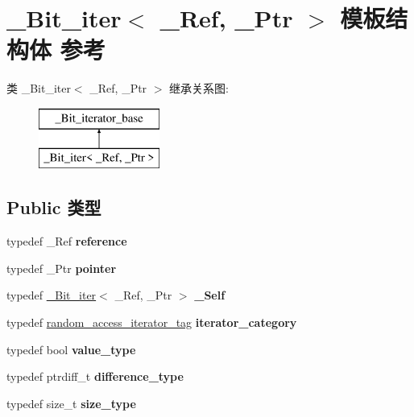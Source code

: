 \hypertarget{struct___bit__iter}{}\section{\+\_\+\+Bit\+\_\+iter$<$ \+\_\+\+Ref, \+\_\+\+Ptr $>$ 模板结构体 参考}
\label{struct___bit__iter}
类 \+\_\+\+Bit\+\_\+iter$<$ \+\_\+\+Ref, \+\_\+\+Ptr $>$ 继承关系图\+:\begin{figure}[H]
\begin{center}
\leavevmode
\includegraphics[height=2.000000cm]{struct___bit__iter}
\end{center}
\end{figure}
\subsection*{Public 类型}
\begin{DoxyCompactItemize}
\item 
\mbox{\label{struct___bit__iter_aed67c7032dc7e6f9d72cb81bc4229959}} 
typedef \+\_\+\+Ref {\bfseries reference}
\item 
\mbox{\label{struct___bit__iter_aefebc109513def679e787a0020251453}} 
typedef \+\_\+\+Ptr {\bfseries pointer}
\item 
\mbox{\label{struct___bit__iter_a9f1d4fb1f31a23badeb59ba93e2523e8}} 
typedef \hyperlink{struct___bit__iter}{\+\_\+\+Bit\+\_\+iter}$<$ \+\_\+\+Ref, \+\_\+\+Ptr $>$ {\bfseries \+\_\+\+Self}
\item 
\mbox{\label{struct___bit__iter_a47bd37711dfa5d7f27a9484c98b69c74}} 
typedef \hyperlink{structrandom__access__iterator__tag}{random\+\_\+access\+\_\+iterator\+\_\+tag} {\bfseries iterator\+\_\+category}
\item 
\mbox{\label{struct___bit__iter_ad910ce1c5583c2e01f1c442ae1da45f1}} 
typedef bool {\bfseries value\+\_\+type}
\item 
\mbox{\label{struct___bit__iter_aea73c464c98d3c6ad484509eb70be4b2}} 
typedef ptrdiff\+\_\+t {\bfseries difference\+\_\+type}
\item 
\mbox{\label{struct___bit__iter_ac6a3e94f385525ec25945d7f037ecefd}} 
typedef size\+\_\+t {\bfseries size\+\_\+type}
\end{DoxyCompactItemize}

